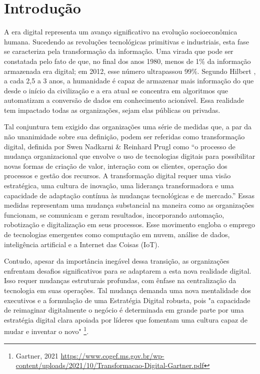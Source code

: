 \section{Introdução}

A era digital representa um avanço significativo na evolução socioeconômica humana. Sucedendo as revoluções tecnológicas primitivas e industriais, esta fase se caracteriza pela transformação da informação. Uma virada que pode ser constatada pelo fato de que, no final dos anos 1980, menos de 1\% da informação armazenada era digital; em 2012, esse número ultrapassou 99\%. Segundo Hilbert \cite{hilbert2020digital}, a cada 2,5 a 3 anos, a humanidade é capaz de armazenar mais informação do que desde o início da civilização e a era atual se concentra em algoritmos que automatizam a conversão de dados em conhecimento acionável. Essa realidade tem impactado todas as organizações, sejam elas públicas ou privadas.

Tal conjuntura tem exigido das organizações uma série de medidas que, a par da não unanimidade sobre sua definição, podem ser referidas como transformação digital, definida por Swen Nadkarni \& Reinhard Prugl \cite{nadkarni2021digital} como “o processo de mudança organizacional que envolve o uso de tecnologias digitais para possibilitar novas formas de criação de valor, interação com os clientes, operação dos processos e gestão dos recursos. A transformação digital requer uma visão estratégica, uma cultura de inovação, uma liderança transformadora e uma capacidade de adaptação contínua às mudanças tecnológicas e de mercado.” Essas medidas representam uma mudança substancial na maneira como as organizações funcionam, se comunicam e geram resultados, incorporando automação, robotização e digitalização em seus processos. Esse movimento engloba o emprego de tecnologias emergentes como computação em nuvem, análise de dados, inteligência artificial e a Internet das Coisas (IoT). 

Contudo, apesar da importância inegável dessa transição, as organizações enfrentam desafios significativos para se adaptarem a esta nova realidade digital. Isso requer mudanças estruturais profundas, com ênfase na centralização da tecnologia em suas operações. Tal mudança demanda uma nova mentalidade dos executivos e a formulação de uma Estratégia Digital robusta, pois "a capacidade de reimaginar digitalmente o negócio é determinada em grande parte por uma estratégia digital clara apoiada por líderes que fomentam uma cultura capaz de mudar e inventar o novo" \footnote{Gartner, 2021 \url{https://www.cogef.ms.gov.br/wp-content/uploads/2021/10/Transformacao-Digital-Gartner.pdf}}.

